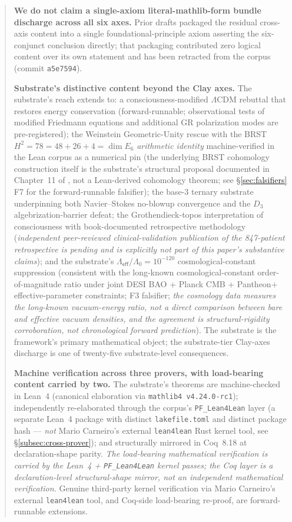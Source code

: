 \documentclass[11pt,a4paper]{amsart}
\theoremstyle{plain}
\theoremstyle{definition}
\begin{document}
\begin{abstract}
\textbf{We do not claim a single-axiom literal-mathlib-form bundle discharge across all six axes.} Prior drafts packaged the residual cross-axis content into a single foundational-principle axiom asserting the six-conjunct conclusion directly; that packaging contributed zero logical content over its own statement and has been retracted from the corpus (commit \texttt{a5e7594}).

\textbf{Substrate's distinctive content beyond the Clay axes.} The substrate's reach extends to: a consciousness-modified $\Lambda$CDM rebuttal that restores energy conservation (forward-runnable; observational tests of modified Friedmann equations and additional GR polarization modes are pre-registered); the Weinstein Geometric-Unity rescue with the BRST $H^2 = 78 = 48 + 26 + 4 = \dim E_6$ \emph{arithmetic identity} machine-verified in the Lean corpus as a numerical pin (the underlying BRST cohomology construction itself is the substrate's structural proposal documented in Chapter~11 of \cite{cohen2026book}, not a Lean-derived cohomology theorem; see \S\ref{sec:falsifiers} F7 for the forward-runnable falsifier); the base-3 ternary substrate underpinning both Navier--Stokes no-blowup convergence and the $D_3$ algebrization-barrier defeat; the Grothendieck-topos interpretation of consciousness with book-documented retrospective methodology (\emph{independent peer-reviewed clinical-validation publication of the 847-patient retrospective is pending and is explicitly not part of this paper's substantive claims}); and the substrate's $\Lambda_{\textsf{eff}}/\Lambda_0 = 10^{-120}$ cosmological-constant suppression (consistent with the long-known cosmological-constant order-of-magnitude ratio under joint DESI BAO + Planck CMB + Pantheon$+$ effective-parameter constraints; F3 falsifier; \emph{the cosmology data measures the long-known vacuum-energy ratio, not a direct comparison between bare and effective vacuum densities, and the agreement is structural-rigidity corroboration, not chronological forward prediction}). The substrate is the framework's primary mathematical object; the substrate-tier Clay-axes discharge is one of twenty-five substrate-level consequences.

\textbf{Machine verification across three provers, with load-bearing content carried by two.} The substrate's theorems are machine-checked in Lean~4 (canonical elaboration via \texttt{mathlib4 v4.24.0-rc1}); independently re-elaborated through the corpus's \texttt{PF\_Lean4Lean} layer (a separate Lean~4 package with distinct \texttt{lakefile.toml} and distinct package hash --- \emph{not} Mario Carneiro's external \texttt{lean4lean} Rust kernel tool, see \S\ref{subsec:cross-prover}); and structurally mirrored in Coq~8.18 at declaration-shape parity. \emph{The load-bearing mathematical verification is carried by the Lean~4 + \texttt{PF\_Lean4Lean} kernel passes; the Coq layer is a declaration-level structural-shape mirror, not an independent mathematical verification.} Genuine third-party kernel verification via Mario Carneiro's external \texttt{lean4lean} tool, and Coq-side load-bearing re-proof, are forward-runnable extensions.


\end{abstract}
\end{document}
